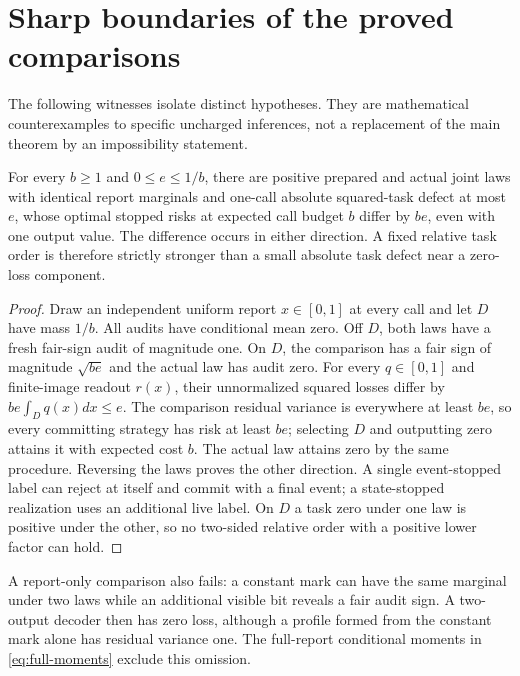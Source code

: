 \section{Sharp boundaries of the proved comparisons}\label{sec:boundaries}
The following witnesses isolate distinct hypotheses. They are mathematical counterexamples to specific uncharged inferences, not a replacement of the main theorem by an impossibility statement.

\begin{proposition}\label{prop:absolute-sharp}
For every $b\ge1$ and $0\le e\le1/b$, there are positive prepared and actual joint laws with identical report marginals and one-call absolute squared-task defect at most $e$, whose optimal stopped risks at expected call budget $b$ differ by $be$, even with one output value. The difference occurs in either direction. A fixed relative task order is therefore strictly stronger than a small absolute task defect near a zero-loss component.
\end{proposition}
\begin{proof}
Draw an independent uniform report $x\in[0,1]$ at every call and let $D$ have mass $1/b$. All audits have conditional mean zero. Off $D$, both laws have a fresh fair-sign audit of magnitude one. On $D$, the comparison has a fair sign of magnitude $\sqrt{be}$ and the actual law has audit zero. For every $q\in[0,1]$ and finite-image readout $r(x)$, their unnormalized squared losses differ by $be\int_Dq(x)dx\le e$. The comparison residual variance is everywhere at least $be$, so every committing strategy has risk at least $be$; selecting $D$ and outputting zero attains it with expected cost $b$. The actual law attains zero by the same procedure. Reversing the laws proves the other direction. A single event-stopped label can reject at itself and commit with a final event; a state-stopped realization uses an additional live label. On $D$ a task zero under one law is positive under the other, so no two-sided relative order with a positive lower factor can hold.
\end{proof}

A report-only comparison also fails: a constant mark can have the same marginal under two laws while an additional visible bit reveals a fair audit sign. A two-output decoder then has zero loss, although a profile formed from the constant mark alone has residual variance one. The full-report conditional moments in \eqref{eq:full-moments} exclude this omission.



